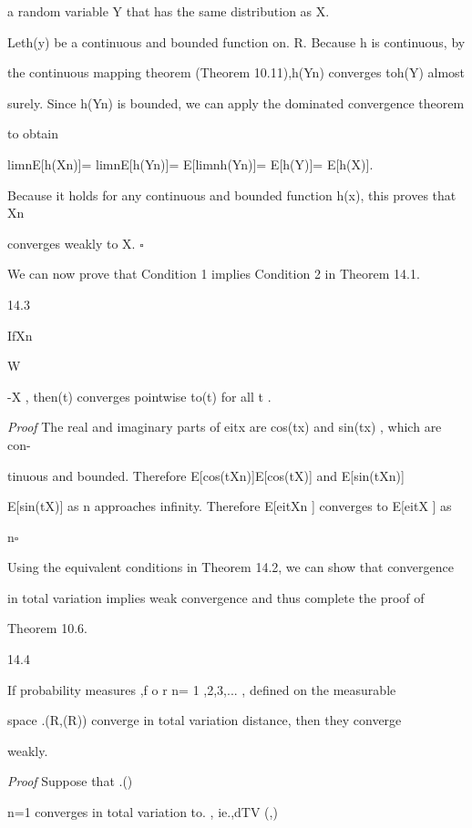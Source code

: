a random variable Y that has the same distribution as X.

Leth(y) be a continuous and bounded function on. R. Because h is continuous, by

the continuous mapping theorem (Theorem 10.11),h(Yn) converges toh(Y) almost

surely. Since h(Yn) is bounded, we can apply the dominated convergence theorem

to obtain

limn\to\infty E[h(Xn)]= limn\to\infty E[h(Yn)]= E[limn\to\infty h(Yn)]= E[h(Y)]= E[h(X)].

Because it holds for any continuous and bounded function h(x), this proves that Xn

converges weakly to X. \hfill $\square$

We can now prove that Condition 1 implies Condition 2 in Theorem 14.1.

\begin{thmbox}{14.3}
\end{thmbox}

IfXn

W

-\to X , then\phiXn (t) converges pointwise to\phiX(t) for all t .

\textit{Proof} The real and imaginary parts of eitx are cos(tx) and sin(tx) , which are con-

tinuous and bounded. Therefore E[cos(tXn)]\to E[cos(tX)] and E[sin(tXn)]\to

E[sin(tX)] as n approaches infinity. Therefore E[eitXn ] converges to E[eitX ] as

n\to\infty \hfill $\square$

Using the equivalent conditions in Theorem 14.2, we can show that convergence

in total variation implies weak convergence and thus complete the proof of

Theorem 10.6.

\begin{thmbox}{14.4}
\end{thmbox}

If probability measures \mun,f o r n= 1 ,2,3,... , defined on the measurable

space .(R,(R)) converge in total variation distance, then they converge

weakly.

\textit{Proof} Suppose that .(\mun)\infty

n=1 converges in total variation to. \mu, ie.,dTV (\mun,\mu )

